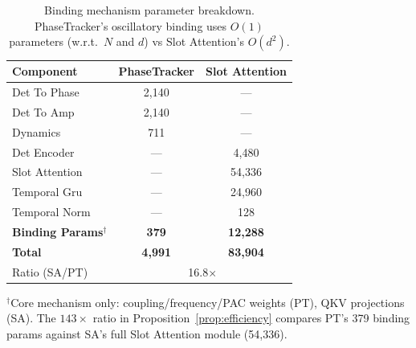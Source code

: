 \begin{table}[t]
\centering
\caption{Binding mechanism parameter breakdown. PhaseTracker's oscillatory binding uses $O(1)$ parameters (w.r.t.\ $N$ and $d$) vs Slot Attention's $O(d^2)$.}
\label{tab:binding_params}
\begin{tabular}{lcc}
\toprule
Component & PhaseTracker & Slot Attention \\
\midrule
Det To Phase & 2,140 & --- \\
Det To Amp & 2,140 & --- \\
Dynamics & 711 & --- \\
\midrule
Det Encoder & --- & 4,480 \\
Slot Attention & --- & 54,336 \\
Temporal Gru & --- & 24,960 \\
Temporal Norm & --- & 128 \\
\midrule
\textbf{Binding Params$^\dagger$} & \textbf{379} & \textbf{12,288} \\
\textbf{Total} & \textbf{4,991} & \textbf{83,904} \\
Ratio (SA/PT) & \multicolumn{2}{c}{16.8$\times$} \\
\bottomrule
\end{tabular}
\vspace{0.3em}

{\footnotesize $^\dagger$Core mechanism only: coupling/frequency/PAC weights (PT), QKV projections (SA). The $143\times$ ratio in Proposition~\ref{prop:efficiency} compares PT's 379 binding params against SA's full Slot Attention module (54{,}336).}
\end{table}